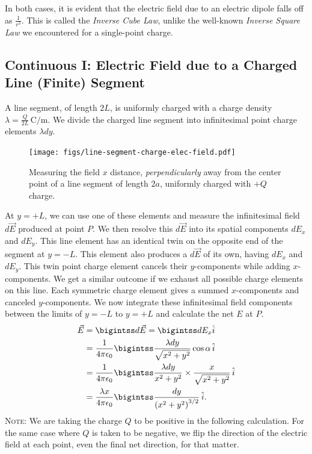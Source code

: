 \documentclass[12pt,b4paper]{article}
\begin{document}
In both cases, it is evident that the electric field due to an electric dipole falls off as $\displaystyle\frac{1}{r^3}$. This is called the \textit{Inverse Cube Law}, unlike the well-known \textit{Inverse Square Law} we encountered for a single-point charge.
\subsection{Continuous I: Electric Field due to a Charged Line (Finite) Segment}
A line segment, of length $2L$, is uniformly charged with a charge density $\displaystyle\lambda=\frac{Q}{2L}\,\unit{\coulomb\per\meter}$. We divide the charged line segment into infinitesimal point charge elements $\lambda dy$. 
\begin{figure}[H]
    \centering
    \texttt{[image: figs/line-segment-charge-elec-field.pdf]}
    \caption{Measuring the field $x$ distance, \textit{perpendicularly} away from the center point of a line segment of length $2a$, uniformly charged with $+Q$ charge.}
    \label{fig:line-segment-charge-elec-field}
\end{figure}
At $y=+L$, we can use one of these elements and measure the infinitesimal field $d\vec{E}$ produced at point $P$. We then resolve this $d\vec{E}$ into its spatial components $dE_x$ and $dE_y$. This line element has an identical twin on the opposite end of the segment at $y=-L$. This element also produces a $d\vec{E}$ of its own, having $dE_x$ and $dE_y$. This twin point charge element cancels their $y$-components while adding $x$-components. We get a similar outcome if we exhaust all possible charge elements on this line. Each symmetric charge element gives a summed $x$-components and canceled $y$-components. We now integrate these infinitesimal field components between the limits of $y=-L$ to $y=+L$ and calculate the net $E$ at $P$.  
\begin{align}
    \vec{E} &= \bigintss d\vec{E} = \bigintss dE_x \hat{i} \\\notag
    &=\frac{1}{4\pi\epsilon_0}\bigintss\frac{\lambda dy}{\sqrt{x^2+y^2}}\cos\alpha \, \hat{i}\notag\\
    &=\frac{1}{4\pi\epsilon_0}\bigintss\frac{\lambda dy}{x^2+y^2}\times\frac{x}{\sqrt{x^2+y^2}}\,\hat{i}\notag\\
    &=\frac{\lambda x}{4\pi\epsilon_0}\bigintss\frac{ dy}{\left(x^2+y^2\right)^{3/2}}\,\hat{i}.\label{eq:line-charge-pause}
\end{align}
\textsc{Note}: We are taking the charge $Q$ to be positive in the following calculation. For the same case where $Q$ is taken to be negative, we flip the direction of the electric field at each point, even the final net direction, for that matter.
\end{document}
